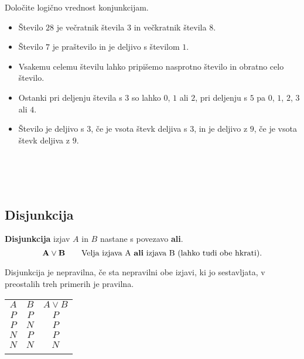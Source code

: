          

         
             \begin{naloga}
                Določite logično vrednost konjunkcijam.
                \begin{itemize}
                    \item Število $28$ je večratnik števila $3$ in večkratnik števila $8$.
                    \item Število $7$ je praštevilo in je deljivo s številom $1$.
                    \item Vsakemu celemu številu lahko pripišemo nasprotno število in obratno celo število.
                    \item Ostanki pri deljenju števila s $3$ so lahko $0$, $1$ ali $2$, 
                        pri deljenju s $5$ pa $0$, $1$, $2$, $3$ ali $4$.
                    \item Število je deljivo s $3$, če je vsota števk deljiva s $3$, in je 
                        deljivo z $9$, če je vsota števk deljiva z $9$.
                \end{itemize}
            \end{naloga}
         

         ~\\~\\~
             \subsection{Disjunkcija}
                \textbf{Disjunkcija} izjav $A$ in $B$ nastane s povezavo \textbf{ali}.
                $$ \mathbf{A\lor B} \quad \quad \textmd{Velja izjava A \textbf{ali} izjava B 
                (lahko tudi obe hkrati).}$$
             
                      
                        Disjunkcija je nepravilna, če sta nepravilni obe izjavi, ki jo sestavljata,
                        v preostalih treh primerih je pravilna.
                     

                    \begin{table}[H]
                        \centering
                        \begin{tabular}{||c|c|c||} 
                        \hhline{|t:===:t|}
                        \rowcolor[rgb]{0.843,0.718,0.718} $A$ & $B$ & $A\lor B$  \\ 
                        \hhline{|:===:|}
                        $P$ & $P$ & $P$                         \\ 
                        \hline
                        $P$ & $N$ & $P$                         \\ 
                        \hline
                        $N$ & $P$ & $P$                         \\ 
                        \hline
                        $N$ & $N$ & $N$                         \\
                        \hhline{|b:===:b|}
                        \end{tabular}
                    \end{table}



